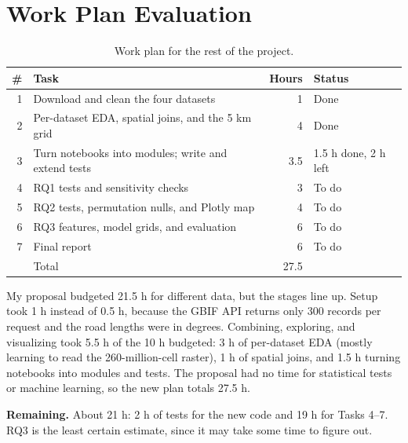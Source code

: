 \documentclass[11pt, a4paper]{article}
\begin{document}
\section{Work Plan Evaluation}
\label{sec:plan}
\begin{table}[!htb]
  \centering
  \caption{Work plan for the rest of the project.}
  \label{tab:plan}
  \begin{tabular}{@{}rlrl@{}}
    \toprule
    \# & Task                                                & Hours & Status               \\
    \midrule
    1  & Download and clean the four datasets                & 1     & Done                 \\
    2  & Per-dataset EDA, spatial joins, and the 5 km grid   & 4     & Done                 \\
    3  & Turn notebooks into modules; write and extend tests & 3.5   & 1.5 h done, 2 h left \\
    4  & RQ1 tests and sensitivity checks                    & 3     & To do                \\
    5  & RQ2 tests, permutation nulls, and Plotly map        & 4     & To do                \\
    6  & RQ3 features, model grids, and evaluation           & 6     & To do                \\
    7  & Final report                                        & 6     & To do                \\
    \midrule
       & Total                                               & 27.5  &                      \\
    \bottomrule
  \end{tabular}
\end{table}

\noindent My proposal budgeted 21.5 h for different data, but the stages line up. Setup took 1 h instead of 0.5 h, because the GBIF API returns only 300 records per request and the road lengths were in degrees. Combining, exploring, and visualizing took 5.5 h of the 10 h budgeted: 3 h of per-dataset EDA (mostly learning to read the 260-million-cell raster), 1 h of spatial joins, and 1.5 h turning notebooks into modules and tests. The proposal had no time for statistical tests or machine learning, so the new plan totals 27.5 h.

\noindent\textbf{Remaining.} About 21 h: 2 h of tests for the new code and 19 h for Tasks 4--7. RQ3 is the least certain estimate, since it may take some time to figure out.
\end{document}
